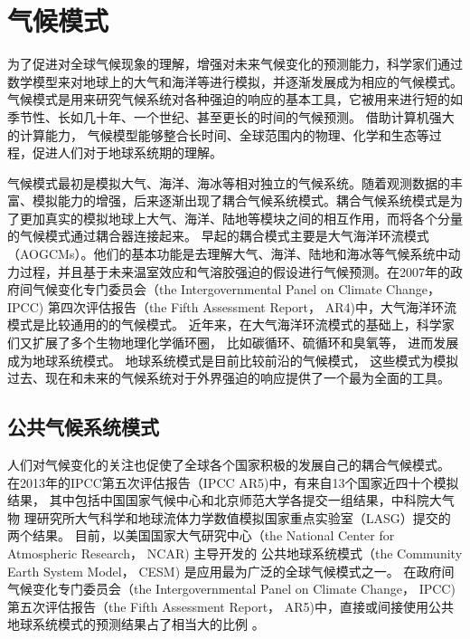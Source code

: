  
\section{气候模式}

为了促进对全球气候现象的理解，增强对未来气候变化的预测能力，科学家们通过数学模型来对地球上的大气和海洋等进行模拟，并逐渐发展成为相应的气候模式。
气候模式是用来研究气候系统对各种强迫的响应的基本工具，它被用来进行短的如季节性、长如几十年、一个世纪、甚至更长的时间的气候预测。 
借助计算机强大的计算能力， 气候模型能够整合长时间、全球范围内的物理、化学和生态等过程，促进人们对于地球系统期的理解\cite{hurrell2013community}。


气候模式最初是模拟大气、海洋、海冰等相对独立的气候系统。随着观测数据的丰富、模拟能力的增强，后来逐渐出现了耦合气候系统模式。耦合气候系统模式是为了更加真实的模拟地球上大气、海洋、陆地等模块之间的相互作用，而将各个分量的气候模式通过耦合器连接起来。
早起的耦合模式主要是大气海洋环流模式（AOGCMs）。他们的基本功能是去理解大气、海洋、陆地和海冰等气候系统中动力过程，并且基于未来温室效应和气溶胶强迫的假设进行气候预测。在2007年的政府间气候变化专门委员会（the
Intergovernmental Panel on Climate Change， IPCC) 第四次评估报告（the Fifth Assessment
Report， AR4)中，大气海洋环流模式是比较通用的的气候模式\cite{solomon2007climate}。
近年来，在大气海洋环流模式的基础上，科学家们又扩展了多个生物地理化学循环圈， 比如碳循环、硫循环和臭氧等， 进而发展成为地球系统模式。 地球系统模式是目前比较前沿的气候模式，
这些模式为模拟过去、现在和未来的气候系统对于外界强迫的响应提供了一个最为全面的工具。 

\subsection{公共气候系统模式}
 
 

人们对气候变化的关注也促使了全球各个国家积极的发展自己的耦合气候模式。
在2013年的IPCC第五次评估报告（IPCC AR5)中，有来自13个国家近四十个模拟结果，
其中包括中国国家气候中心和北京师范大学各提交一组结果，中科院大气物
理研究所大气科学和地球流体力学数值模拟国家重点实验室（LASG）提交的两个结果\cite{stocker2013ipcc}。 
目前，以美国国家大气研究中心（the National Center for Atmospheric Research， NCAR) 主导开发的
公共地球系统模式（the Community Earth System Model， CESM) 是应用最为广泛的全球气候模式之一。
在政府间气候变化专门委员会（the
Intergovernmental Panel on Climate Change， IPCC) 第五次评估报告（the Fifth Assessment
Report， AR5)中，直接或间接使用公共地球系统模式的预测结果占了相当大的比例 \cite{stocker2013ipcc}。
 

